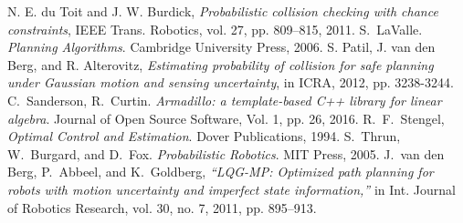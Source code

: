 \documentclass[journal]{IEEEtran}
\begin{document}
%
%
%
\begin{thebibliography}{1}


 N. E. du Toit and J. W. Burdick, \emph{Probabilistic collision checking with chance constraints}, IEEE Trans. Robotics, vol. 27, pp. 809–815, 2011.
 S.~LaValle. \emph{Planning Algorithms}. Cambridge University Press, 2006.
 S. Patil, J. van den Berg, and R. Alterovitz, \emph{Estimating probability of collision for safe planning under Gaussian motion and sensing uncertainty}, in ICRA, 2012, pp. 3238-3244.
 C.~Sanderson, R.~Curtin. \emph{Armadillo: a template-based C++ library for linear algebra}. Journal of Open Source Software, Vol. 1, pp. 26, 2016.
 R.~F.~Stengel, \emph{Optimal Control and Estimation}. Dover Publications, 1994.
 S.~Thrun, W.~Burgard, and D.~Fox. \emph{Probabilistic Robotics}. MIT Press, 2005.
J.~van den Berg, P.~Abbeel, and K.~Goldberg, \emph{“LQG-MP: Optimized path planning for robots with motion uncertainty and imperfect state information,”} in Int. Journal of Robotics Research, vol. 30, no. 7, 2011, pp. 895–913.

\end{thebibliography}

% 
\end{document}
